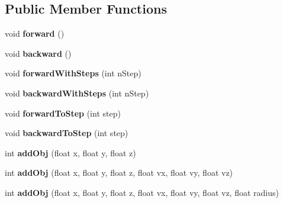\subsection*{Public Member Functions}
\begin{DoxyCompactItemize}
\item 
void {\bfseries forward} ()\hypertarget{classns__phys_1_1_phys_engine_a9fc2b79b0307434f1920ed7f9fac1a29}{}\label{classns__phys_1_1_phys_engine_a9fc2b79b0307434f1920ed7f9fac1a29}

\item 
void {\bfseries backward} ()\hypertarget{classns__phys_1_1_phys_engine_a8b5439170138f002f50b0ccf55237fd9}{}\label{classns__phys_1_1_phys_engine_a8b5439170138f002f50b0ccf55237fd9}

\item 
void {\bfseries forward\+With\+Steps} (int n\+Step)\hypertarget{classns__phys_1_1_phys_engine_a29005de7b0db9124790195c3f8b15540}{}\label{classns__phys_1_1_phys_engine_a29005de7b0db9124790195c3f8b15540}

\item 
void {\bfseries backward\+With\+Steps} (int n\+Step)\hypertarget{classns__phys_1_1_phys_engine_a5a5ddf8cb0c792ad9d6ed845d5ee71fa}{}\label{classns__phys_1_1_phys_engine_a5a5ddf8cb0c792ad9d6ed845d5ee71fa}

\item 
void {\bfseries forward\+To\+Step} (int step)\hypertarget{classns__phys_1_1_phys_engine_a0f99f2b558449a18fd465ac2a71278e6}{}\label{classns__phys_1_1_phys_engine_a0f99f2b558449a18fd465ac2a71278e6}

\item 
void {\bfseries backward\+To\+Step} (int step)\hypertarget{classns__phys_1_1_phys_engine_a69eb3807dc2e4522411c2c58a12043bf}{}\label{classns__phys_1_1_phys_engine_a69eb3807dc2e4522411c2c58a12043bf}

\item 
int {\bfseries add\+Obj} (float x, float y, float z)\hypertarget{classns__phys_1_1_phys_engine_ad4584c92c9eb3ad38bcf19cca21e5286}{}\label{classns__phys_1_1_phys_engine_ad4584c92c9eb3ad38bcf19cca21e5286}

\item 
int {\bfseries add\+Obj} (float x, float y, float z, float vx, float vy, float vz)\hypertarget{classns__phys_1_1_phys_engine_a1aaadc57ba8e6cd7bb66dc1facc41ea9}{}\label{classns__phys_1_1_phys_engine_a1aaadc57ba8e6cd7bb66dc1facc41ea9}

\item 
int {\bfseries add\+Obj} (float x, float y, float z, float vx, float vy, float vz, float radius)\hypertarget{classns__phys_1_1_phys_engine_ac81fb341960e89021b5525ca4356a971}{}\label{classns__phys_1_1_phys_engine_ac81fb341960e89021b5525ca4356a971}


\end{DoxyCompactItemize}
